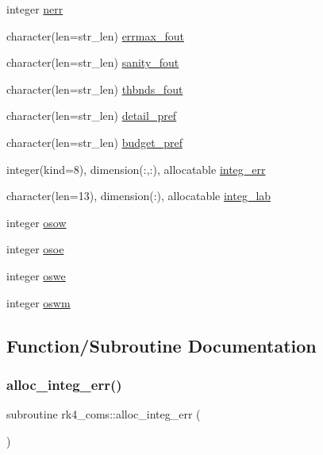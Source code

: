 \begin{DoxyCompactItemize}
integer \hyperlink{namespacerk4__coms_a8e2fcadf9c0fe34be391e95bd3caa31c}{nerr}
\item 
character(len=str\+\_\+len) \hyperlink{namespacerk4__coms_af90527ec55879335bb58710234142b14}{errmax\+\_\+fout}
\item 
character(len=str\+\_\+len) \hyperlink{namespacerk4__coms_a673279a49daaa7f21ade0992c6fe0c0d}{sanity\+\_\+fout}
\item 
character(len=str\+\_\+len) \hyperlink{namespacerk4__coms_ab106d324ed571335ee763dd190e7430d}{thbnds\+\_\+fout}
\item 
character(len=str\+\_\+len) \hyperlink{namespacerk4__coms_acd58047348a9b1ff25ec1afda9163705}{detail\+\_\+pref}
\item 
character(len=str\+\_\+len) \hyperlink{namespacerk4__coms_a2da1f732b9648b485c93d62814060cf2}{budget\+\_\+pref}
\item 
integer(kind=8), dimension(\+:,\+:), allocatable \hyperlink{namespacerk4__coms_aecab6dfff0aaea0938b5c59d550860bc}{integ\+\_\+err}
\item 
character(len=13), dimension(\+:), allocatable \hyperlink{namespacerk4__coms_a4f5c8dc79c821a459a356f283b4831c8}{integ\+\_\+lab}
\item 
integer \hyperlink{namespacerk4__coms_ac28f34645e6cd2065bc8c458ae43f642}{osow}
\item 
integer \hyperlink{namespacerk4__coms_a62d65ed745bfd02b36c79be5861b7cee}{osoe}
\item 
integer \hyperlink{namespacerk4__coms_ae9733bb77416a4d137c65ddd1adc5c23}{oswe}
\item 
integer \hyperlink{namespacerk4__coms_a588b443c0107fd03a7642394a2df5cc9}{oswm}
\end{DoxyCompactItemize}


\subsection{Function/\+Subroutine Documentation}
\mbox{\label{namespacerk4__coms_a8266a2612a37eea2fc3106633e25f954}} 
\subsubsection{\texorpdfstring{alloc\+\_\+integ\+\_\+err()}{alloc\_integ\_err()}}
{\footnotesize\ttfamily subroutine rk4\+\_\+coms\+::alloc\+\_\+integ\+\_\+err (\begin{DoxyParamCaption}{ }\end{DoxyParamCaption})}

